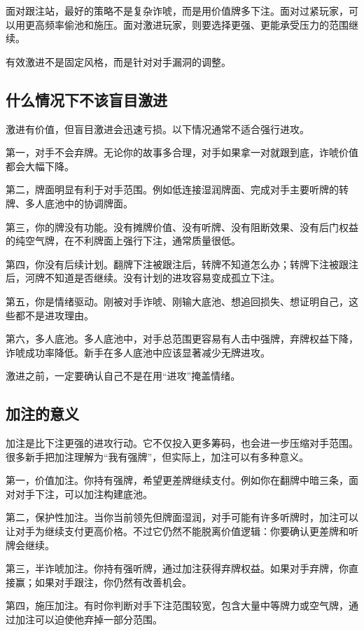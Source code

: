 面对跟注站，最好的策略不是复杂诈唬，而是用价值牌多下注。面对过紧玩家，可以用更高频率偷池和施压。面对激进玩家，则要选择更强、更能承受压力的范围继续。

有效激进不是固定风格，而是针对对手漏洞的调整。

\subsection{什么情况下不该盲目激进}

激进有价值，但盲目激进会迅速亏损。以下情况通常不适合强行进攻。

第一，对手不会弃牌。无论你的故事多合理，对手如果拿一对就跟到底，诈唬价值都会大幅下降。

第二，牌面明显有利于对手范围。例如低连接湿润牌面、完成对手主要听牌的转牌、多人底池中的协调牌面。

第三，你的牌没有功能。没有摊牌价值、没有听牌、没有阻断效果、没有后门权益的纯空气牌，在不利牌面上强行下注，通常质量很低。

第四，你没有后续计划。翻牌下注被跟注后，转牌不知道怎么办；转牌下注被跟注后，河牌不知道是否继续。没有计划的进攻容易变成孤立下注。

第五，你是情绪驱动。刚被对手诈唬、刚输大底池、想追回损失、想证明自己，这些都不是进攻理由。

第六，多人底池。多人底池中，对手总范围更容易有人击中强牌，弃牌权益下降，诈唬成功率降低。新手在多人底池中应该显著减少无牌进攻。

激进之前，一定要确认自己不是在用“进攻”掩盖情绪。

\subsection{加注的意义}

加注是比下注更强的进攻行动。它不仅投入更多筹码，也会进一步压缩对手范围。很多新手把加注理解为“我有强牌”，但实际上，加注可以有多种意义。

第一，价值加注。你持有强牌，希望更差牌继续支付。例如你在翻牌中暗三条，面对对手下注，可以加注构建底池。

第二，保护性加注。当你当前领先但牌面湿润，对手可能有许多听牌时，加注可以让对手为继续支付更高价格。不过它仍然不能脱离价值逻辑：你要确认更差牌和听牌会继续。

第三，半诈唬加注。你持有强听牌，通过加注获得弃牌权益。如果对手弃牌，你直接赢；如果对手跟注，你仍然有改善机会。

第四，施压加注。有时你判断对手下注范围较宽，包含大量中等牌力或空气牌，通过加注可以迫使他弃掉一部分范围。

